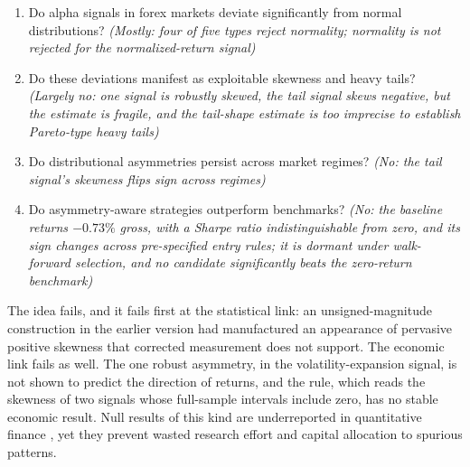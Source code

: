 \documentclass[11pt]{article}
\begin{document}
\begin{enumerate}
    \item Do alpha signals in forex markets deviate significantly from normal distributions? \textit{(Mostly: four of five types reject normality; normality is not rejected for the normalized-return signal)}
    \item Do these deviations manifest as exploitable skewness and heavy tails? \textit{(Largely no: one signal is robustly skewed, the tail signal skews negative, but the estimate is fragile, and the tail-shape estimate is too imprecise to establish Pareto-type heavy tails)}
    \item Do distributional asymmetries persist across market regimes? \textit{(No: the tail signal's skewness flips sign across regimes)}
    \item Do asymmetry-aware strategies outperform benchmarks? \textit{(No: the baseline returns $-0.73\%$ gross, with a Sharpe ratio indistinguishable from zero, and its sign changes across pre-specified entry rules; it is dormant under walk-forward selection, and no candidate significantly beats the zero-return benchmark)}
\end{enumerate}

The idea fails, and it fails first at the statistical link: an unsigned-magnitude construction in the earlier version had manufactured an appearance of pervasive positive skewness that corrected measurement does not support. The economic link fails as well. The one robust asymmetry, in the volatility-expansion signal, is not shown to predict the direction of returns, and the rule, which reads the skewness of two signals whose full-sample intervals include zero, has no stable economic result. Null results of this kind are underreported in quantitative finance \citep{harvey2017presidential}, yet they prevent wasted research effort and capital allocation to spurious patterns.
\end{document}
